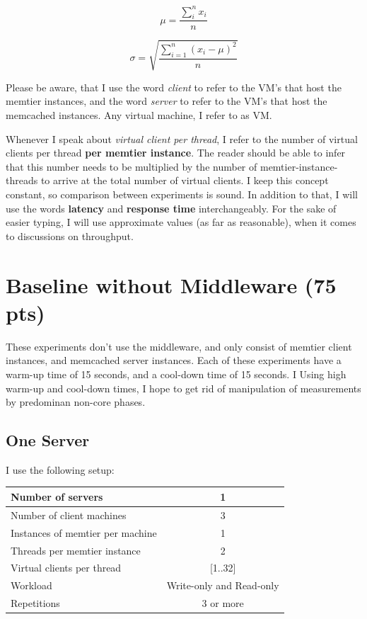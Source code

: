 \documentclass[11pt,a4paper]{article}
\begin{document}
\begin{equation}
\mu = \frac{\sum_i^n x_i} {n}
\end{equation}

\begin{equation}
\sigma = \sqrt{ \frac{\displaystyle\sum_{i=1}^{n}(x_i - \mu)^2} {n} }
\end{equation}

Please be aware, that I use the word \textit{client} to refer to the VM's that host the memtier instances, and the word \textit{server} to refer to the VM's that host the memcached instances.
Any virtual machine, I refer to as VM.

Whenever I speak about \textit{virtual client per thread}, I refer to the number of virtual clients per thread \textbf{per memtier instance}.
The reader should be able to infer that this number needs to be multiplied by the number of memtier-instance-threads to arrive at the total number of virtual clients.
I keep this concept constant, so comparison between experiments is sound.
In addition to that, I will use the words \textbf{latency} and \textbf{response time} interchangeably.
For the sake of easier typing, I will use approximate values (as far as reasonable), when it comes to discussions on throughput.

\newpage

\section{Baseline without Middleware (75 pts)}
These experiments don't use the middleware, and only consist of memtier client instances, and memcached server instances.
Each of these experiments have a warm-up time of 15 seconds, and a cool-down time of 15 seconds.
I Using high warm-up and cool-down times, I hope to get rid of manipulation of measurements by predominan non-core phases.

\subsection{One Server}

I use the following setup:

\begin{center}
	\scriptsize{
		\begin{tabular}{|l|c|}
			\hline Number of servers                & 1                        \\ 
			\hline Number of client machines        & 3                        \\ 
			\hline Instances of memtier per machine & 1                        \\ 
			\hline Threads per memtier instance     & 2                        \\
			\hline Virtual clients per thread       & [1..32]                  \\ 
			\hline Workload                         & Write-only and Read-only \\
			\hline Repetitions                      & 3 or more                \\ 
			\hline 
		\end{tabular}
	} 
\end{center}
\end{document}
